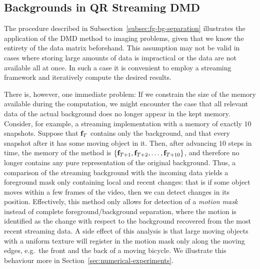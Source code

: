 \subsection{Backgrounds in QR Streaming DMD} %

The procedure described in Subsection~\ref{subsec:fg-bg-separation} illustrates the application of the DMD method to imaging problems, given that we know the entirety of the data matrix beforehand. This assumption may not be valid in cases where storing large amounts of data is impractical or the data are not available all at once. In such a case it is convenient to employ a streaming framework and iteratively compute the desired results.

There is, however, one immediate problem: If we constrain the size of the memory available during the computation, we might encounter the case that all relevant data of the actual background does no longer appear in the kept memory. Consider, for example, a streaming implementation with a memory of exactly $10$ snapshots. Suppose that $\mathbf{f}_T$ contains only the background, and that every snapshot after it has some moving object in it. Then, after advancing $10$ steps in time, the memory of the method is $\left\{\mathbf{f}_{T + 1}, \mathbf{f}_{T + 2}, \dots, \mathbf{f}_{T + 10}\right\}$, and therefore no longer contains any pure representation of the original background. Thus, a comparison of the streaming background with the incoming data yields a foreground mask only containing local and recent changes: that is if some object moves within a few frames of the video, then we can detect changes in its position. Effectively, this method only allows for detection of a \emph{motion mask} instead of complete foreground/background separation, where the motion is identified as the change with respect to the background recovered from the most recent streaming data. A side effect of this analysis is that large moving objects with a uniform texture will register in the motion mask only along the moving edges, e.g.\ the front and the back of a moving bicycle. We illustrate this behaviour more in Section~\ref{sec:numerical-experiments}.

